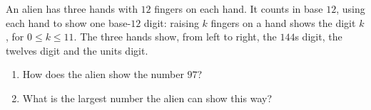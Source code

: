 An alien has three hands with $12$ fingers on each hand. It counts in base $12$, using each hand to show one base-$12$ digit: raising $k$ fingers on a hand shows the digit $k$, for $0\le k\le11$. The three hands show, from left to right, the $144$s digit, the twelves digit and the units digit.
\begin{enumerate}
\item[(a)] How does the alien show the number $97$?
\item[(b)] What is the largest number the alien can show this way?
\end{enumerate}
